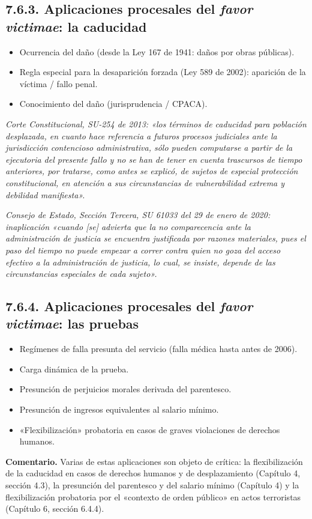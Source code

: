\subsection{7.6.3. Aplicaciones procesales del \textit{favor victimae}: la caducidad}
\begin{itemize}
\item Ocurrencia del daño (desde la Ley 167 de 1941: daños por obras públicas).
\item Regla especial para la desaparición forzada (Ley 589 de 2002): aparición de la víctima / fallo penal.
\item Conocimiento del daño (jurisprudencia / CPACA).
\end{itemize}
\begin{cita}
\textit{Corte Constitucional, SU-254 de 2013: «los términos de caducidad para población desplazada, en cuanto hace referencia a futuros procesos judiciales ante la jurisdicción contencioso administrativa, sólo pueden computarse a partir de la ejecutoria del presente fallo y no se han de tener en cuenta trascursos de tiempo anteriores, por tratarse, como antes se explicó, de sujetos de especial protección constitucional, en atención a sus circunstancias de vulnerabilidad extrema y debilidad manifiesta».}
\par
\textit{Consejo de Estado, Sección Tercera, SU 61033 del 29 de enero de 2020: inaplicación «cuando [se] advierta que la no comparecencia ante la administración de justicia se encuentra justificada por razones materiales, pues el paso del tiempo no puede empezar a correr contra quien no goza del acceso efectivo a la administración de justicia, lo cual, se insiste, depende de las circunstancias especiales de cada sujeto».}
\end{cita}
\subsection{7.6.4. Aplicaciones procesales del \textit{favor victimae}: las pruebas}
\begin{itemize}
\item Regímenes de falla presunta del servicio (falla médica hasta antes de 2006).
\item Carga dinámica de la prueba.
\item Presunción de perjuicios morales derivada del parentesco.
\item Presunción de ingresos equivalentes al salario mínimo.
\item «Flexibilización» probatoria en casos de graves violaciones de derechos humanos.
\end{itemize}
\begin{comentario}
\textcolor[HTML]{8A6D3B}{\textbf{Comentario. }}Varias de estas aplicaciones son objeto de crítica: la flexibilización de la caducidad en casos de derechos humanos y de desplazamiento (Capítulo 4, sección 4.3), la presunción del parentesco y del salario mínimo (Capítulo 4) y la flexibilización probatoria por el «contexto de orden público» en actos terroristas (Capítulo 6, sección 6.4.4).
\end{comentario}
